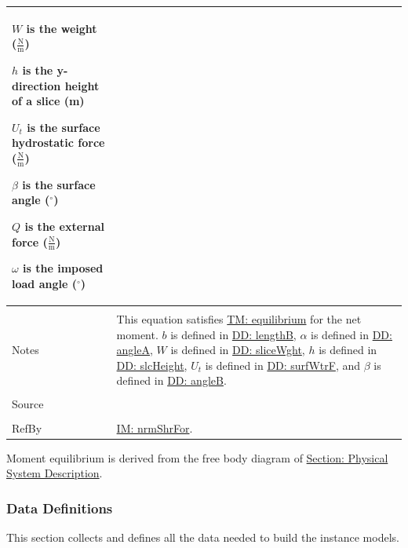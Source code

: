 \documentclass[12pt]{article}
\begin{document}
\begin{minipage}{\textwidth}
\begin{tabular}{p{} p{}}
\begin{symbDescription}
                                         \item{$W$ is the weight ($\frac{\text{N}}{\text{m}}$)}
                                         \item{$h$ is the y-direction height of a slice (m)}
                                         \item{${U_{t}}$ is the surface hydrostatic force ($\frac{\text{N}}{\text{m}}$)}
                                         \item{$β$ is the surface angle (${}^{\circ}$)}
                                         \item{$Q$ is the external force ($\frac{\text{N}}{\text{m}}$)}
                                         \item{$ω$ is the imposed load angle (${}^{\circ}$)}
                                         \end{symbDescription}
                                         \\ \midrule \\
                                         Notes & This equation satisfies \hyperref[TM:equilibrium]{TM: equilibrium} for the net moment. $b$ is defined in \hyperref[DD:lengthB]{DD: lengthB}, $α$ is defined in \hyperref[DD:angleA]{DD: angleA}, $W$ is defined in \hyperref[DD:sliceWght]{DD: sliceWght}, $h$ is defined in \hyperref[DD:slcHeight]{DD: slcHeight}, ${U_{t}}$ is defined in \hyperref[DD:surfWtrF]{DD: surfWtrF}, and $β$ is defined in \hyperref[DD:angleB]{DD: angleB}.
                                                 \\ \midrule \\
                                                 Source & \cite{chen2005}
                                                          \\ \midrule \\
                                                          RefBy & \hyperref[IM:nrmShrFor]{IM: nrmShrFor}.
\\ \bottomrule \end{tabular}
\end{minipage}
Moment equilibrium is derived from the free body diagram of \hyperref[Sec:PhysSyst]{Section: Physical System Description}.
\subsubsection{Data Definitions}
\label{Sec:DDs}
This section collects and defines all the data needed to build the instance models.
\par~
\end{document}
